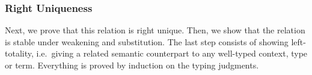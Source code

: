 
\subsubsection{Right Uniqueness}

Next, we prove that this relation is right unique.  Then, we show that the
relation is stable under weakening and substitution.  The last step consists of
showing left-totality, i.e.\ giving a related semantic counterpart to any
well-typed context, type or term.  Everything is proved by induction on the typing
judgments.

